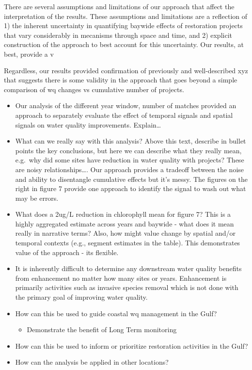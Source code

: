 \documentclass[]{article}
\providecommand{\tightlist}{%
  \setlength{\itemsep}{0pt}\setlength{\parskip}{0pt}}
\begin{document}
There are several assumptions and limitations of our approach that
affect the interpretation of the results. These assumptions and
limitations are a reflection of 1) the inherent uncertainty in
quantifying baywide effects of restoration projects that vary
considerably in mecanisms through space and time, and 2) explicit
construction of the approach to best account for this uncertainty. Our
results, at best, provide a v

Regardless, our results provided confirmation of previously and
well-described xyz that suggests there is some validity in the approach
that goes beyond a simple comparison of wq changes vs cumulative number
of projects.

\begin{itemize}
\item
  Our analysis of the different year window, number of matches provided
  an approach to separately evaluate the effect of temporal signals and
  spatial signals on water quality improvements. Explain\ldots{}
\item
  What can we really say with this analysis? Above this text, describe
  in bullet points the key conclusions, but here we can describe what
  they really mean, e.g.~why did some sites have reduction in water
  quality with projects? These are noisy relationships\ldots{}. Our
  approach provides a tradeoff between the noise and ability to
  disentangle cumulative effects but it's messy. The figures on the
  right in figure 7 provide one approach to identify the signal to wash
  out what may be errors.
\item
  What does a 2ug/L reduction in chlorophyll mean for figure 7? This is
  a highly aggregated estimate across years and baywide - what does it
  mean really in narrative terms? Also, how might value change by
  spatial and/or temporal contexts (e.g., segment estimates in the
  table). This demonstrates value of the approach - its flexible.
\item
  It is inherently difficult to determine any downstream water quality
  benefits from enhancement no matter how many sites or years.
  Enhancement is primarily activities such as invasive species removal
  which is not done with the primary goal of improving water quality.
\item
  How can this be used to guide coastal wq management in the Gulf?

  \begin{itemize}
  \tightlist
  \item
    Demonstrate the benefit of Long Term monitoring
  \end{itemize}
\item
  How can this be used to inform or prioritize restoration activities in
  the Gulf?
\item
  How can the analysis be applied in other locations?
\end{itemize}
\end{document}

